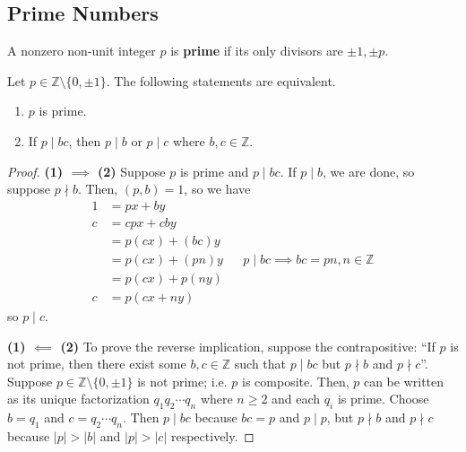 \documentclass [12pt] {article}
\newcommand{\Z}{\mathbb{Z}}
\newenvironment{definition}[1]{\begin{tcolorbox}[title={Definition: #1},colback=blue!5!white,colframe=black!75!blue]}{\end{tcolorbox}}
\newenvironment{theorem}[1]{\begin{tcolorbox}[title={Theorem #1},colback=green!5!white,colframe=black!75!green]}{\end{tcolorbox}}
\renewcommand{\bf}[1]{\textbf{{#1}}}
\begin{document}
\subsection{Prime Numbers}
\begin{definition}{Prime}
    A nonzero non-unit integer $p$ is \bf{prime} if its only divisors are $\pm 1, \pm p$.
\end{definition}

\begin{theorem}{}
    Let $p \in \Z \setminus \{0, \pm 1\}$. The following statements are equivalent.
    \begin{enumerate}[label=(\arabic*)]
        \item $p$ is prime.
        \item If $p \mid bc$, then $p \mid b$ or $p \mid c$ where $b, c \in \Z$.
    \end{enumerate}
\end{theorem}
\begin{proof}
    \bf{(1) $\bm{\implies}$ (2)}
    Suppose $p$ is prime and $p \mid bc$. If $p \mid b$, we are done, so suppose $p \nmid b$. Then,
    $(p, b) = 1$, so we have
    \begin{align*}
        1 &= px + by \\
        c &= cpx + cby \\
          &= p(cx) + (bc)y \\
          &= p(cx) + (pn)y && p \mid bc \implies bc = pn, n \in \Z \\
          &= p(cx) + p(ny) \\
        c &= p(cx + ny)
    \end{align*}
    so $p \mid c$.
    \vspace{0.5em}

    \bf{(1) $\bm{\impliedby}$ (2)}
    To prove the reverse implication, suppose the contrapositive: ``If $p$ is not prime, then there
    exist some $b, c \in \Z$ such that $p \mid bc$ but $p \nmid b$ and $p \nmid c$''. Suppose
    $p \in \Z \setminus \{ 0, \pm 1 \}$ is not prime; i.e. $p$ is composite. Then, $p$ can be
    written as its unique factorization $q_1 q_2 \cdots q_n$ where $n \geq 2$ and each $q_i$ is
    prime. Choose $b = q_1$ and $c = q_2 \cdots q_n$. Then $p \mid bc$ because $bc = p$ and
    $p \mid p$, but $p \nmid b$ and $p \nmid c$ because $|p| > |b|$ and $|p| > |c|$ respectively.
\end{proof}
\end{document}
